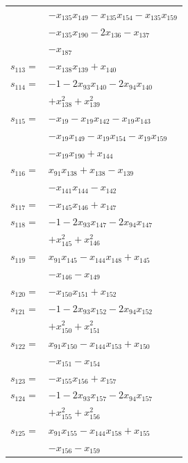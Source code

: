 \begin{longtable}{@{}r@{\;}l@{}}
 & \(\displaystyle -x_{135}x_{149} -x_{135}x_{154} -x_{135}x_{159}\) \\
 & \(\displaystyle -x_{135}x_{190} -2x_{136} -x_{137}\) \\
 & \(\displaystyle -x_{187}\) \\[3pt]
\(s_{113}=\) & \(\displaystyle -x_{138}x_{139} +x_{140}\) \\[3pt]
\(s_{114}=\) & \(\displaystyle -1 -2x_{93}x_{140} -2x_{94}x_{140}\) \\
 & \(\displaystyle +x_{138}^{2} +x_{139}^{2}\) \\[3pt]
\(s_{115}=\) & \(\displaystyle -x_{19} -x_{19}x_{142} -x_{19}x_{143}\) \\
 & \(\displaystyle -x_{19}x_{149} -x_{19}x_{154} -x_{19}x_{159}\) \\
 & \(\displaystyle -x_{19}x_{190} +x_{144}\) \\[3pt]
\(s_{116}=\) & \(\displaystyle x_{91}x_{138} +x_{138} -x_{139}\) \\
 & \(\displaystyle -x_{141}x_{144} -x_{142}\) \\[3pt]
\(s_{117}=\) & \(\displaystyle -x_{145}x_{146} +x_{147}\) \\[3pt]
\(s_{118}=\) & \(\displaystyle -1 -2x_{93}x_{147} -2x_{94}x_{147}\) \\
 & \(\displaystyle +x_{145}^{2} +x_{146}^{2}\) \\[3pt]
\(s_{119}=\) & \(\displaystyle x_{91}x_{145} -x_{144}x_{148} +x_{145}\) \\
 & \(\displaystyle -x_{146} -x_{149}\) \\[3pt]
\(s_{120}=\) & \(\displaystyle -x_{150}x_{151} +x_{152}\) \\[3pt]
\(s_{121}=\) & \(\displaystyle -1 -2x_{93}x_{152} -2x_{94}x_{152}\) \\
 & \(\displaystyle +x_{150}^{2} +x_{151}^{2}\) \\[3pt]
\(s_{122}=\) & \(\displaystyle x_{91}x_{150} -x_{144}x_{153} +x_{150}\) \\
 & \(\displaystyle -x_{151} -x_{154}\) \\[3pt]
\(s_{123}=\) & \(\displaystyle -x_{155}x_{156} +x_{157}\) \\[3pt]
\(s_{124}=\) & \(\displaystyle -1 -2x_{93}x_{157} -2x_{94}x_{157}\) \\
 & \(\displaystyle +x_{155}^{2} +x_{156}^{2}\) \\[3pt]
\(s_{125}=\) & \(\displaystyle x_{91}x_{155} -x_{144}x_{158} +x_{155}\) \\
 & \(\displaystyle -x_{156} -x_{159}\) \\[3pt]

\end{longtable}

